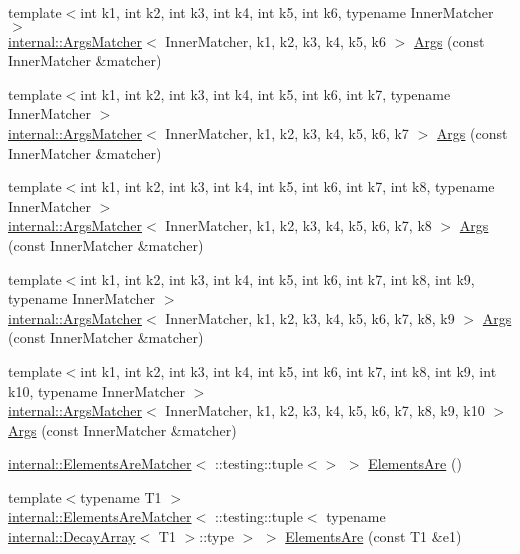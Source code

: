 \begin{DoxyCompactItemize}
\item 
{\footnotesize template$<$int k1, int k2, int k3, int k4, int k5, int k6, typename Inner\+Matcher $>$ }\\\hyperlink{classtesting_1_1internal_1_1_args_matcher}{internal\+::\+Args\+Matcher}$<$ Inner\+Matcher, k1, k2, k3, k4, k5, k6 $>$ \hyperlink{namespacetesting_abc92e87b4a9cad372b082d81479f3d48}{Args} (const Inner\+Matcher \&matcher)
\item 
{\footnotesize template$<$int k1, int k2, int k3, int k4, int k5, int k6, int k7, typename Inner\+Matcher $>$ }\\\hyperlink{classtesting_1_1internal_1_1_args_matcher}{internal\+::\+Args\+Matcher}$<$ Inner\+Matcher, k1, k2, k3, k4, k5, k6, k7 $>$ \hyperlink{namespacetesting_a9a9ef7a866b397430527076e342817f9}{Args} (const Inner\+Matcher \&matcher)
\item 
{\footnotesize template$<$int k1, int k2, int k3, int k4, int k5, int k6, int k7, int k8, typename Inner\+Matcher $>$ }\\\hyperlink{classtesting_1_1internal_1_1_args_matcher}{internal\+::\+Args\+Matcher}$<$ Inner\+Matcher, k1, k2, k3, k4, k5, k6, k7, k8 $>$ \hyperlink{namespacetesting_ae8a4e8e1b8eb87c9f1e5f02519da7fce}{Args} (const Inner\+Matcher \&matcher)
\item 
{\footnotesize template$<$int k1, int k2, int k3, int k4, int k5, int k6, int k7, int k8, int k9, typename Inner\+Matcher $>$ }\\\hyperlink{classtesting_1_1internal_1_1_args_matcher}{internal\+::\+Args\+Matcher}$<$ Inner\+Matcher, k1, k2, k3, k4, k5, k6, k7, k8, k9 $>$ \hyperlink{namespacetesting_a62c877e01fb9098cd3c399f921bf4e3e}{Args} (const Inner\+Matcher \&matcher)
\item 
{\footnotesize template$<$int k1, int k2, int k3, int k4, int k5, int k6, int k7, int k8, int k9, int k10, typename Inner\+Matcher $>$ }\\\hyperlink{classtesting_1_1internal_1_1_args_matcher}{internal\+::\+Args\+Matcher}$<$ Inner\+Matcher, k1, k2, k3, k4, k5, k6, k7, k8, k9, k10 $>$ \hyperlink{namespacetesting_a09ac462e8d6ed468cbfaa9c767aee0aa}{Args} (const Inner\+Matcher \&matcher)
\item 
\hyperlink{classtesting_1_1internal_1_1_elements_are_matcher}{internal\+::\+Elements\+Are\+Matcher}$<$ \+::testing\+::tuple$<$$>$ $>$ \hyperlink{namespacetesting_a79cf4ae694bf8231dcf283b325405f27}{Elements\+Are} ()
\item 
{\footnotesize template$<$typename T1 $>$ }\\\hyperlink{classtesting_1_1internal_1_1_elements_are_matcher}{internal\+::\+Elements\+Are\+Matcher}$<$ \+::testing\+::tuple$<$ typename \hyperlink{structtesting_1_1internal_1_1_decay_array}{internal\+::\+Decay\+Array}$<$ T1 $>$\+::type $>$ $>$ \hyperlink{namespacetesting_aa35aa6c9638d989e9f4aaa6009f60589}{Elements\+Are} (const T1 \&e1)
$$
\end{DoxyCompactItemize}
